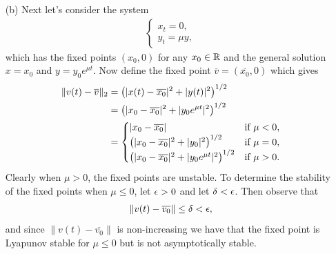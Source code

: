 \documentclass[12pt]{report}
\begin{document}
\begin{solution}
\begin{enumerate}
        \item[(b)]
        Next let's consider the system 
        \begin{align*}
            \begin{cases}
                x_t = 0,\\
                y_t = \mu y,
            \end{cases}
        \end{align*}
        which has the fixed points $(x_0, 0)$ for any $x_0 \in {\mathbb R}$ and the general solution $x = x_0$ and $y = y_0 e^{\mu t}$. Now define the fixed point $\overline{v} = (\overline{x_0},0)$ which gives
        \begin{align*}
            \|v(t) - \overline{v}\|_2 &= {\left( |x(t) - \overline{x_0}|^2 + |y(t)|^2\right)}^{1/2}\\
            &= {\left(|x_0 - \overline{x_0}|^2 + |y_0 e^{\mu t}|^2\right)}^{1/2}\\
            &= \begin{cases}
                |x_0 - \overline{x_0}| &\text{if} ~ \mu < 0,\\
                {\left(|x_0 - \overline{x_0}|^2 + |y_0|^2\right)}^{1/2} &\text{if}~ \mu = 0,\\
                {\left(|x_0 - \overline{x_0}|^2 + |y_0 e^{\mu t}|^2\right)}^{1/2} &\text{if}~ \mu > 0.
            \end{cases}
        \end{align*}
        Clearly when $\mu > 0$, the fixed points are unstable. To determine the stability of the fixed points when $\mu \leq 0$, let ${\epsilon} > 0$ and let $\delta < {\epsilon}$. Then observe that
        \begin{align*}
            \| v(t) - \overline{v_0}\| \leq \delta < {\epsilon}, 
        \end{align*}
        and since $\| v(t) - \overline{v_0}\|$ is non-increasing we have that the fixed point is Lyapunov stable for $\mu \leq 0$ but is not asymptotically stable.




    \end{enumerate}
        
\end{solution}

\newpage


\end{document}
